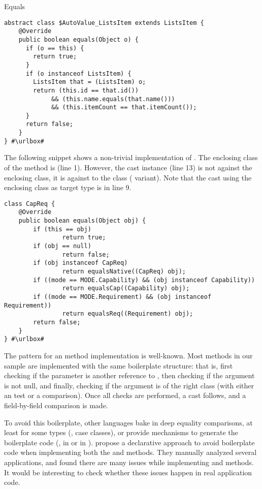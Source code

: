 \begin{pattern}{Equals}
\begin{verbatim}
abstract class $AutoValue_ListsItem extends ListsItem {
    @Override
    public boolean equals(Object o) {
      if (o == this) {
        return true;
      }
      if (o instanceof ListsItem) {
        ListsItem that = (ListsItem) o;
        return (this.id == that.id())
             && (this.name.equals(that.name()))
             && (this.itemCount == that.itemCount());
      }
      return false;
    }
} #\urlbox#
\end{verbatim}

The following snippet shows a non-trivial implementation of .
The enclosing class of the  method is  (line 1).
However, the cast instance (line 13) is not against the enclosing class,
it is against to the  class ( variant).
Note that the cast using the enclosing class as target type is in line 9.

\def\urlvar{http://bit.ly/bndtools_bnd_2SM5pOw}
\begin{verbatim}
class CapReq {
    @Override
    public boolean equals(Object obj) {
        if (this == obj)
                return true;
        if (obj == null)
                return false;
        if (obj instanceof CapReq)
                return equalsNative((CapReq) obj);
        if ((mode == MODE.Capability) && (obj instanceof Capability))
                return equalsCap((Capability) obj);
        if ((mode == MODE.Requirement) && (obj instanceof Requirement))
                return equalsReq((Requirement) obj);
        return false;
    }
} #\urlbox#
\end{verbatim}


\issues{}
The pattern for an  method implementation is well-known.
Most  methods in our sample are implemented with the same boilerplate structure:
that is, first checking if the parameter is another reference to ,
then checking if the argument is not null,
and finally, checking if the argument is of the right class
(with either an  test or a  comparison).
Once all checks are performed, a cast follows, and a field-by-field comparison is made.

To avoid this boilerplate, other languages bake in deep equality comparisons,
at least for some types (\eg, \scala{} case classes),
or provide mechanisms to generate the boilerplate code (\eg, 
in \haskell{} or \code{\#[derive(Eq)]} in \rust{}).
\cite{vaziriDeclarativeObjectIdentity2007} propose a declarative approach to avoid boilerplate code when implementing
both the  and  methods.
They manually analyzed several applications, and found there are many issues while implementing  and  methods.
It would be interesting to check whether these issues happen in real application code.


\end{pattern}
